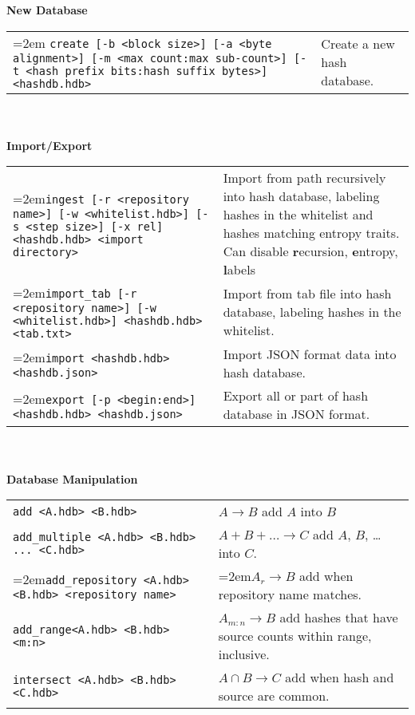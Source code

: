 \begin{footnotesize}
\textbf{New Database} \\
\begin{tabular}{p{3.6 in} p{3.0 in}}
\hangindent=2em \texttt{create [-b <block size>] [-a <byte alignment>] [-m <max count:max sub-count>] [-t <hash prefix bits:hash suffix bytes>] <hashdb.hdb>} &
Create a new hash database.\\
\end{tabular}
\\
\\
\textbf{Import/Export} \\
\begin{tabular}{p{3.6 in} p{3.0 in}}
\hangindent=2em\texttt{ingest [-r <repository name>] [-w <whitelist.hdb>] [-s <step size>] [-x rel] <hashdb.hdb> <import directory>} &
Import from path recursively into hash database, labeling hashes in the whitelist and hashes matching entropy traits.  Can disable \textbf{r}ecursion, \textbf{e}ntropy, \textbf{l}abels \\
\hangindent=2em\texttt{import\_tab [-r <repository name>] [-w <whitelist.hdb>] <hashdb.hdb> <tab.txt>} &
Import from tab file into hash database, labeling hashes in the whitelist.\\
\hangindent=2em\texttt{import <hashdb.hdb> <hashdb.json>} &
Import JSON format data into hash database.\\
\hangindent=2em\texttt{export [-p <begin:end>] <hashdb.hdb> <hashdb.json>} &
Export all or part of hash database in JSON format.\\
\end{tabular}
\\
\\
\textbf{Database Manipulation} \\
\begin{tabular}{p{3.6 in} p{3.0 in}}
\texttt{add <A.hdb> <B.hdb>} & $A \rightarrow B$ add $A$ into $B$ \\
\texttt{add\_multiple <A.hdb> <B.hdb> ... <C.hdb>} & $A + B + \ldots \rightarrow C$ add $A$, $B$, \ldots into $C$.\\
\hangindent=2em\texttt{add\_repository <A.hdb> <B.hdb> <repository name>} & \hangindent=2em$A_r \rightarrow B$ add when repository name matches.\\
\texttt{add\_range<A.hdb> <B.hdb> <m:n>} & $A_{m:n} \rightarrow B$ add hashes that have source counts within range, inclusive.\\
\texttt{intersect <A.hdb> <B.hdb> <C.hdb>} & $A \cap B \rightarrow C$ add when hash and source are common.\\

\end{tabular}
\end{footnotesize}
